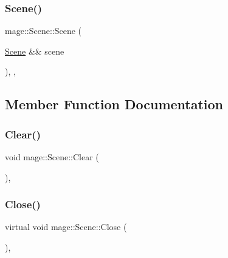 \hypertarget{classmage_1_1_scene_afeae10a3a50bf1d624faa6bd0bf33a7d}{}\label{classmage_1_1_scene_afeae10a3a50bf1d624faa6bd0bf33a7d} 
\subsubsection{\texorpdfstring{Scene()}{Scene()}\hspace{0.1cm}{\footnotesize\ttfamily [3/3]}}
{\footnotesize\ttfamily mage\+::\+Scene\+::\+Scene (\begin{DoxyParamCaption}\item[{\hyperlink{classmage_1_1_scene}{Scene} \&\&}]{scene }\end{DoxyParamCaption})\hspace{0.3cm}{\ttfamily [protected]}, {\ttfamily [default]}, {\ttfamily [noexcept]}}



\subsection{Member Function Documentation}
\hypertarget{classmage_1_1_scene_adf4a5b3885e34336caa5f145f55e01e1}{}\label{classmage_1_1_scene_adf4a5b3885e34336caa5f145f55e01e1} 
\subsubsection{\texorpdfstring{Clear()}{Clear()}}
{\footnotesize\ttfamily void mage\+::\+Scene\+::\+Clear (\begin{DoxyParamCaption}{ }\end{DoxyParamCaption})\hspace{0.3cm}{\ttfamily [private]}, {\ttfamily [noexcept]}}

\hypertarget{classmage_1_1_scene_a16786d7fcf0b813e2e94061b082cfd1d}{}\label{classmage_1_1_scene_a16786d7fcf0b813e2e94061b082cfd1d} 
\subsubsection{\texorpdfstring{Close()}{Close()}}
{\footnotesize\ttfamily virtual void mage\+::\+Scene\+::\+Close (\begin{DoxyParamCaption}{ }\end{DoxyParamCaption})\hspace{0.3cm}{\ttfamily [private]}, {\ttfamily [virtual]}}

